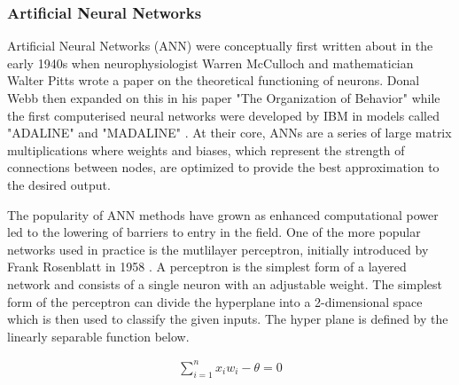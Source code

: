 \documentclass[11pt]{article}
\begin{document}
\subsubsection{Artificial Neural Networks}
Artificial Neural Networks (ANN) were conceptually first written about in the early 1940s \cite{Widrow1990} when neurophysiologist Warren McCulloch and mathematician Walter Pitts wrote a paper on the theoretical functioning of neurons. Donal Webb then expanded on this in his paper "The Organization of Behavior" while the first computerised neural networks were developed by IBM in models called "ADALINE" and "MADALINE" \cite{Widrow1990}. At their core, ANNs are a series of large matrix multiplications where weights and biases, which represent the strength of connections between nodes, are optimized to provide the best approximation to the desired output.\par The popularity of ANN methods have grown as enhanced computational power led to the lowering of barriers to entry in the field. One of the more popular networks used in practice is the mutlilayer perceptron, initially introduced by Frank Rosenblatt in 1958 \cite{Rosenblatt1958}. A perceptron is the simplest form of a layered network and consists of a single neuron with an adjustable weight. The simplest form of the perceptron can divide the hyperplane into a 2-dimensional space which is then used to classify the given inputs. The hyper plane is defined by the linearly separable function below.

\begin{align}
\sum^{n}_{i = 1} x_{i}w_{i} - \theta = 0  
\end{align}
\end{document}

